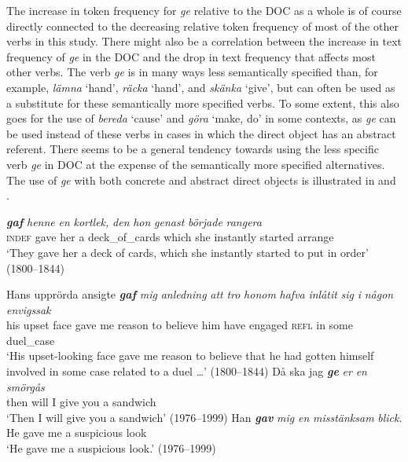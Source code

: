 \documentclass[output=paper]{langscibook}
\begin{document}
The increase in token frequency for \textit{ge} relative to the DOC as a whole is of course directly connected to the decreasing relative token frequency of most of the other verbs in this study. There might also be a correlation between the increase in text frequency of \textit{ge} in the DOC and the drop in text frequency that affects most other verbs. The verb \textit{ge} is in many ways less semantically specified than, for example, \textit{lämna} ‘hand’, \textit{räcka} ‘hand’, and \textit{skänka} ‘give’, but can often be used as a substitute for these semantically more specified verbs. To some extent, this also goes for the use of \textit{bereda} ‘cause’ and \textit{göra} ‘make, do’ in some contexts, as \textit{ge} can be used instead of these verbs in cases in which the direct object has an abstract referent. There seems to be a general tendency towards using the less specific verb \textit{ge} in DOC at the expense of the semantically more specified alternatives. The use of \textit{ge} with both concrete and abstract direct objects is illustrated in  and .


\ea \label{ex:valdeson:34}
\ea {} \textbf{\textit{gaf}} \textit{henne} \textit{en} \textit{kortlek,} \textit{den} \textit{hon} \textit{genast} \textit{började}   \textit{rangera}\\
 \textsc{indef}       gave     her     a   deck\_of\_cards    which    she instantly started           arrange\\ 
\glt ‘They gave her a deck of cards, which she instantly started to put in order’ (1800–1844)

\ex
\gll Hans   upprörda   ansigte \textbf{\textit{gaf}} \textit{mig} \textit{anledning}   \textit{att}   \textit{tro}   \textit{honom} \textit{hafva}   \textit{inlåtit}   \textit{sig}   \textit{i}   \textit{någon} \textit{envigssak}\\
 his       upset         face     gave   me   reason         to     believe  him         have       engaged \textsc{refl} in   some   duel\_case\\
\glt ‘His upset-looking face gave me reason to believe that he had gotten himself involved in some case related to a duel …’ (1800–1844)
\z
\ex \label{ex:valdeson:35}
\ea
\gll Då   ska   jag \textbf{\textit{ge}} \textit{er}     \textit{en} \textit{smörgås}\\
      then   will   I   give you   a   sandwich\\
\glt ‘Then I will give you a sandwich’ (1976–1999)
\ex
\gll Han \textbf{\textit{gav}} \textit{mig}   \textit{en} \textit{misstänksam} \textit{blick}.\\
        He     gave   me     a   suspicious     look\\
\glt ‘He gave me a suspicious look.’ (1976–1999)
\z
\z
\end{document}
